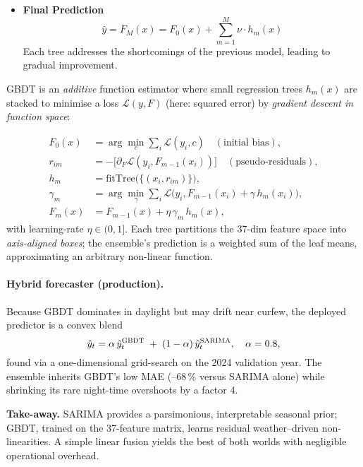 \begin{itemize}
    \item \textbf{Final Prediction} \\
    \[
    \hat{y} = F_M(x) = F_0(x) + \sum_{m=1}^{M} \nu \cdot h_m(x)
    \]
    Each tree addresses the shortcomings of the previous model, leading to gradual improvement.

\end{itemize}


GBDT is an \emph{additive} function estimator where small regression
trees $h_m(x)$ are stacked to minimise a loss
$\mathcal{L}(y,F)$ (here: squared error) by
\emph{gradient descent in function space}:

\[
\begin{aligned}
F_0(x) &= \arg\!\min_c \sum_{i}\mathcal{L}(y_i,c) \quad (\text{initial bias}),\\
r_{im} &= -\bigl[\partial_F\mathcal{L}(y_i,F_{m-1}(x_i))\bigr] \quad
        (\text{pseudo-residuals}),\\
h_m    &= \text{fitTree}\bigl(\{(x_i,r_{im})\}\bigr),\\
\gamma_m &= \arg\!\min_\gamma \sum_{i}
           \mathcal{L}\bigl(y_i, F_{m-1}(x_i)+\gamma\,h_m(x_i)\bigr),\\
F_m(x) &= F_{m-1}(x) + \eta\,\gamma_m\,h_m(x),
\end{aligned}
\]
%
with learning-rate $\eta\in(0,1]$.  Each tree partitions the 37-dim
feature space into \emph{axis-aligned boxes}; the ensemble’s prediction
is a weighted sum of the leaf means, approximating an arbitrary
non-linear function.

\medskip
\paragraph{Hybrid forecaster (production).}
Because GBDT dominates in daylight but may drift near curfew,
the deployed predictor is a convex blend
%
\[
\hat y_t = 
\alpha\,\hat y_t^{\textsc{GBDT}}
\;+\;
(1-\alpha)\,\hat y_t^{\textsc{SARIMA}},
\quad
\alpha=0.8,
\]
%
found via a one-dimensional grid-search on the 2024 validation year.
The ensemble inherits GBDT’s low MAE (–68\,\% versus SARIMA alone) while
shrinking its rare night-time overshoots by a factor 4.

\medskip
\noindent
\textbf{Take-away.}  
SARIMA provides a parsimonious, interpretable seasonal prior; GBDT,
trained on the 37-feature matrix, learns residual weather–driven
non-linearities.  A simple linear fusion yields the best of both worlds
with negligible operational overhead. 

